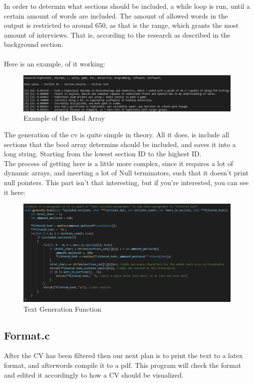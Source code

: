 In order to determin what sections should be included, a while loop is run, until a certain amount of words are included.
The amount of allowed words in the output is restricted to around 650, as that is the range, which grants the most amount of interviews.
That is, according to the research as described in the background section.
\\ \\
Here is an example, of it working: 
\begin{figure}[H]
  \centering
  \includegraphics[scale = 0.6]{figures/bool_example.png}
  \caption{Example of the Bool Array}
\end{figure}
The generation of the cv is quite simple in theory. All it does, is include all sections that the bool array determins should be included, and saves it into a long string.
Starting from the lowest section ID to the highest ID. \\
The process of getting here is a little more complex, since it requires a lot of dynamic arrays, and inserting a lot of Null terminators, such  that it doesn't print null pointers.
This part isn't that interesting, but if you're interested, you can see it here:
\begin{figure}[H]
  \centering
  \includegraphics[scale = 0.6]{figures/generate.png}
  \caption{Text Generation Function}
\end{figure}

\subsection{Format.c}
After the CV has been filtered then our next plan is to print the text to a latex format, and afterwords compile it to a pdf. 
This program will check the format and edited it accordingly to how a CV should be visualized.

